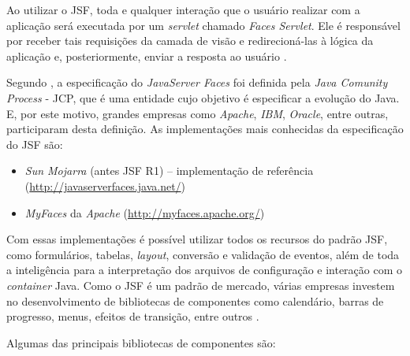 \par Ao utilizar o JSF, toda e qualquer interação que o usuário realizar com a aplicação será executada por 
um \textit{servlet} chamado \textit{Faces Servlet}. Ele é responsável por receber tais requisições da camada 
de visão e redirecioná-las à lógica da aplicação e, posteriormente, enviar a resposta ao 
usuário \cite{faria_java_ee_7_jsf_primefaces_cdi}.

\par Segundo , a especificação do \textit{JavaServer
	Faces} foi definida pela \textit{Java Comunity Process} - JCP\footnotemark[4],
	que é uma entidade cujo objetivo é especificar a evolução do Java. E, por este motivo, grandes empresas como
\textit{Apache}, \textit{IBM}, \textit{Oracle}, entre outras, participaram
desta definição. As implementações mais conhecidas da especificação do JSF são:


\begin{itemize}
	\item \textit{Sun Mojarra} (antes JSF R1) – implementação de referência
	(\url{http://javaserverfaces.java.net/})
	
	\item \textit{MyFaces} da \textit{Apache} (\url{http://myfaces.apache.org/})
\end{itemize}

\par Com essas implementações é possível utilizar todos os recursos do padrão JSF,
como formulários, tabelas, \textit{layout}, conversão e validação de eventos,
além de toda a inteligência para a interpretação dos arquivos de configuração e
interação com o \textit{container} Java. Como o JSF é um padrão de mercado,
várias empresas investem no desenvolvimento de bibliotecas de componentes como
calendário, barras de progresso, menus, efeitos de transição, entre outros 
\cite{livro_programacao_java_para_web}.

\par Algumas das principais bibliotecas de componentes são:

